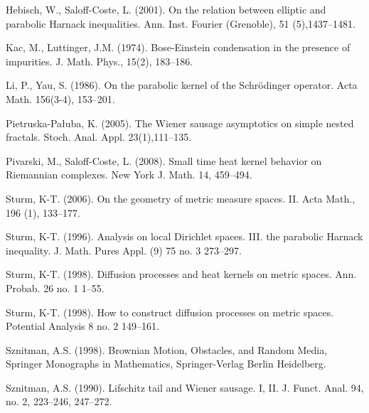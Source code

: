\documentclass[letterpaper,oneside,english]{amsart}
\begin{document}
\begin{thebibliography}{1}
Hebisch, W., Saloff-Coste, L. (2001). 
On the relation between elliptic and parabolic {H}arnack inequalities.
{Ann. Inst. Fourier (Grenoble)}, {51} (5),1437--1481.

Kac, M., Luttinger, J.M. (1974). 
Bose-Einstein condensation in the presence of impurities.
{J. Math. Phys.}, {15}(2), 183--186.

Li, P., Yau, S. (1986).
On the parabolic kernel of the {S}chr\"odinger operator.
 { Acta Math.} { 156}(3-4), 153--201.

Pietruska-Pa{\l}uba, K. (2005). 
The {W}iener sausage asymptotics on simple nested fractals.
{Stoch. Anal. Appl.} {23}(1),111--135.

Pivarski, M., Saloff-Coste, L. (2008).
Small time heat kernel behavior on Riemannian complexes. 
 { New York J. Math.} { 14}, 459--494. 

Sturm, K-T. (2006).
On the geometry of metric measure spaces. {II}.
{Acta Math.}, {196} (1), 133--177.

 Sturm, K-T. (1996).
Analysis on local {D}irichlet spaces. {III}. the parabolic {H}arnack 
inequality. 
{J. Math. Pures Appl. (9)}  {75}
no. 3 
273--297.

 Sturm, K-T. (1998).
 Diffusion processes and heat kernels on metric spaces. 
 {Ann. Probab.}  {26}
no. 1 
1--55. 

 Sturm, K-T. (1998). 
How to construct diffusion processes on metric spaces. 
 {Potential Analysis}  {8} 
no. 2 
149--161.

Sznitman, A.S. (1998).
Brownian Motion, Obstacles, and Random Media,
{Springer Monographs in Mathematics}, Springer-Verlag Berlin Heidelberg.

 Sznitman, A.S. (1990).
Lifschitz tail and {W}iener sausage. I, II. 
{J. Funct. Anal.} 94, no. 2, 223--246, 247--272. 

\end{thebibliography}
\end{document}
